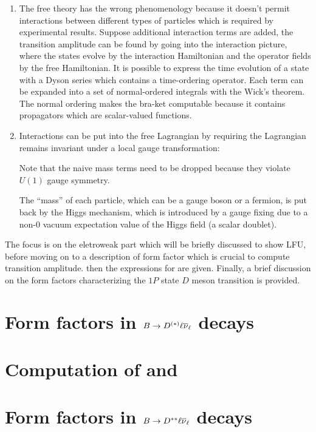 \begin{enumerate}
    \item The free theory has the wrong phenomenology because it doesn't permit
        interactions between different types of particles which is required by
        experimental results.
        Suppose additional interaction terms are added,
        the transition amplitude can be found by going into the interaction
        picture, where the states evolve by the interaction Hamiltonian
        and the operator fields by the free Hamiltonian.
        It is possible to express the time evolution of a state with a Dyson
        series which contains a time-ordering operator.
        Each term can be expanded into a set of normal-ordered integrals with
        the Wick's theorem.
        The normal ordering makes the bra-ket computable because it contains
        propagators which are scalar-valued functions.

    \item Interactions can be put into the free Lagrangian by requiring the
        Lagrangian remains invariant under a local gauge transformation:

        Note that the naive mass terms need to be dropped because they violate
        $U(1)$ gauge symmetry.

        The ``mass'' of each particle, which can be a gauge boson or a fermion,
        is put back by the Higgs mechanism,
        which is introduced by a gauge fixing due to a non-0 vacuum expectation
        value of the Higgs field (a scalar doublet).
\end{enumerate}

The focus is on the eletroweak part which will be briefly discussed to show LFU,
before moving on to a description of form factor which is crucial to compute
transition amplitude.
then the expressions for \RDX are given.
Finally, a brief discussion on the form factors characterizing the $1P$ state
$D$ meson transition is provided.




\section{Form factors in $B \rightarrow D^{(*)}\ell{\ensuremath{{\overline{\nu}}_\ell}}$ decays}
\label{ref:theory:ff-d0-dst}


\section{Computation of \RD and \RDst}
\label{ref:theory:rdx}


\section{Form factors in $B \rightarrow D^{**}\ell{\ensuremath{{\overline{\nu}}_\ell}}$ decays}
\label{ref:theory:ff-dstst}
